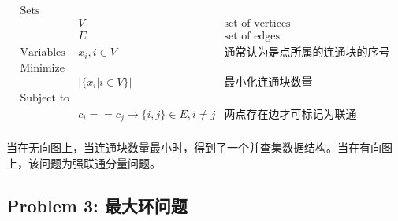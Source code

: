 \documentclass[11pt]{article}
\begin{document}
\begin{eqnarray*}
    \textrm{Sets} \\
        & V & \textrm{set of vertices} \\
        & E & \textrm{set of edges} \\
    \textrm{Variables}
        & x_i, i \in V & \textrm{通常认为是点所属的连通块的序号} \\
    \textrm{Minimize} \\
        & |\{x_i | i \in V \}| & \textrm{最小化连通块数量} \\
    \textrm{Subject to} \\
        & c_i == c_j \to \{i, j\} \in E, i \neq j & \textrm{两点存在边才可标记为联通} \\
\end{eqnarray*}

当在无向图上，当连通块数量最小时，得到了一个并查集数据结构。当在有向图上，该问题为强联通分量问题。

\newpage
\subsection*{Problem 3: 最大环问题}
\end{document}
